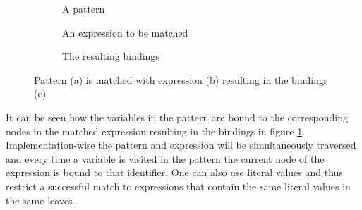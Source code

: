 \begin{figure}[H]
  \centering
  \begin{subfigure}[t]{0.33\textwidth}
    \centering
    \caption{A pattern}
  \end{subfigure}
  \begin{subfigure}[t]{0.32\textwidth}
    \centering
    \caption{An expression to be matched}
  \end{subfigure}
  \begin{subfigure}[t]{0.33\textwidth}
    \centering
    \caption{The resulting bindings}
    \label{subfig:pat-binding}
  \end{subfigure}
  \caption{Pattern (a) is matched with expression (b) resulting in the bindings (c)}
  \label{fig:pattern-match}
\end{figure}

It can be seen how the variables in the pattern are bound to the corresponding nodes in the matched expression resulting in the bindings in figure \ref{subfig:pat-binding}. Implementation-wise the pattern and expression will be simultaneously traversed and every time a variable is visited in the pattern the current node of the expression is bound to that identifier. One can also use literal values and thus restrict a successful match to expressions that contain the same literal values in the same leaves.


